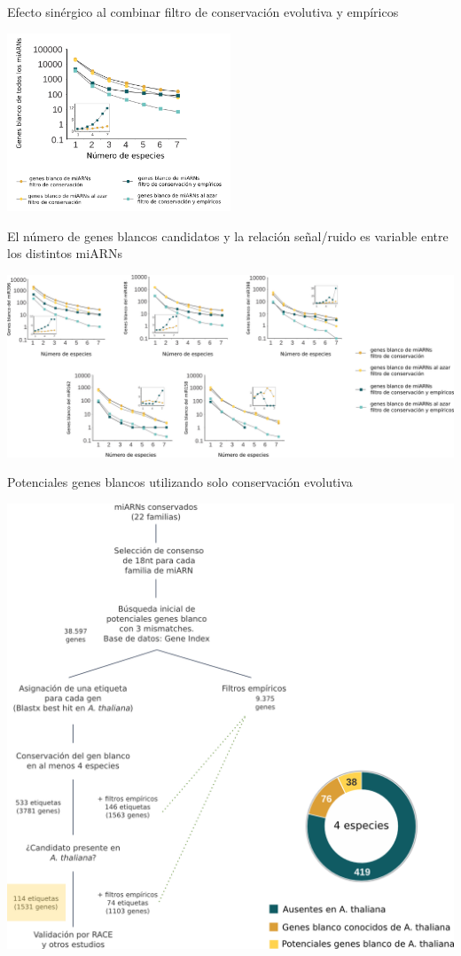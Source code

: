 \documentclass{beamer}
\begin{document}
\begin{frame}{Efecto sinérgico al combinar filtro de conservación evolutiva y empíricos}
	\begin{center}
		\includegraphics[width=0.5\textwidth]{img/NAR_fig2_05.png}
	\end{center}
\end{frame}

\begin{frame}{El número de genes blancos candidatos y la relación señal/ruido es variable entre los distintos miARNs}
	\begin{center}
		\includegraphics[width=1\textwidth]{img/NAR_fig2_bis.png}
	\end{center}
\end{frame}

\begin{frame}{Potenciales genes blancos utilizando solo conservación evolutiva}
	\begin{center}
		\includegraphics[width=.7\textwidth]{img/NAR_fig01y03.png}
	\end{center}
\end{frame}
\end{document}
